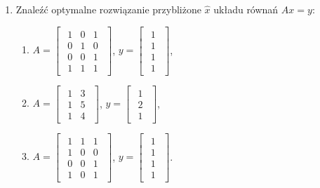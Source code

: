 \documentclass{article}
\begin{document}
\begin{enumerate}
    \item Znaleźć optymalne rozwiązanie przybliżone $\hat{x}$ układu równań $Ax = y$:
        \begin{enumerate}
            \item $A = \begin{bmatrix}\begin{array}{rrr} 1 & 0 & 1\\ 0 & 1 & 0\\ 0 & 0 & 1\\ 1 & 1 & 1 \end{array}\end{bmatrix}$, $y = \begin{bmatrix}\begin{array}{r} 1\\ 1\\ 1\\ 1 \end{array}\end{bmatrix}$,
            \item $A = \begin{bmatrix}\begin{array}{rr} 1 & 3\\ 1 & 5\\ 1 & 4 \end{array}\end{bmatrix}$, $y = \begin{bmatrix}\begin{array}{r} 1\\ 2\\ 1 \end{array}\end{bmatrix}$,
            \item $A = \begin{bmatrix}\begin{array}{rrr} 1 & 1 & 1\\ 1 & 0 & 0\\ 0 & 0 & 1\\ 1 & 0 & 1 \end{array}\end{bmatrix}$, $y = \begin{bmatrix}\begin{array}{r} 1\\ 1\\ 1\\ 1 \end{array}\end{bmatrix}$.
        \end{enumerate}


\end{enumerate}
\end{document}
